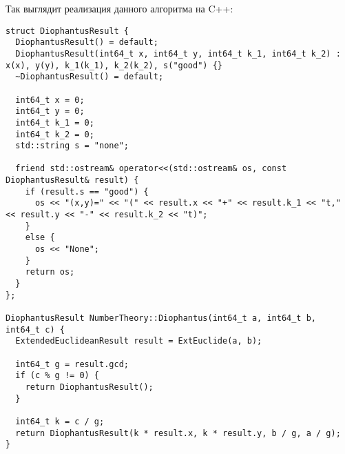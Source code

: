 \documentclass[12pt, a4paper, openany]{book}
\begin{document}
\newpage
\noindent
Так выглядит реализация данного алгоритма на C++:

\begin{lstlisting}[breaklines=true]
struct DiophantusResult {
  DiophantusResult() = default;
  DiophantusResult(int64_t x, int64_t y, int64_t k_1, int64_t k_2) : x(x), y(y), k_1(k_1), k_2(k_2), s("good") {}
  ~DiophantusResult() = default;

  int64_t x = 0;
  int64_t y = 0;
  int64_t k_1 = 0;
  int64_t k_2 = 0;
  std::string s = "none";

  friend std::ostream& operator<<(std::ostream& os, const DiophantusResult& result) {
    if (result.s == "good") {
      os << "(x,y)=" << "(" << result.x << "+" << result.k_1 << "t," << result.y << "-" << result.k_2 << "t)";
    }
    else {
      os << "None";
    }
    return os;
  }
};

DiophantusResult NumberTheory::Diophantus(int64_t a, int64_t b, int64_t c) {
  ExtendedEuclideanResult result = ExtEuclide(a, b);

  int64_t g = result.gcd;
  if (c % g != 0) {
    return DiophantusResult();
  }
  
  int64_t k = c / g;
  return DiophantusResult(k * result.x, k * result.y, b / g, a / g);
}
\end{lstlisting}
\end{document}
